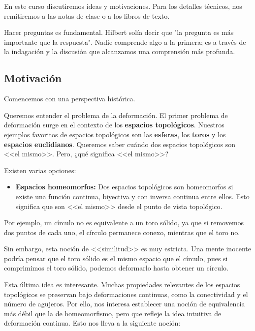 
En este curso discutiremos ideas y motivaciones. Para los detalles técnicos, nos remitiremos a las notas de clase o a los libros de texto.

Hacer preguntas es fundamental. Hilbert solía decir que "la pregunta es más importante que la respuesta". Nadie comprende algo a la primera; es a través de la indagación y la discusión que alcanzamos una comprensión más profunda.

\subsection{Motivación}

Comencemos con una perspectiva histórica.

Queremos entender el problema de la deformación. El primer problema de deformación surge en el contexto de los \textbf{espacios topológicos}. Nuestros ejemplos favoritos de espacios topológicos son las \textbf{esferas}, los \textbf{toros} y los \textbf{espacios euclidianos}. Queremos saber cuándo dos espacios topológicos son <<el mismo>>. Pero, ¿qué significa <<el mismo>>?

Existen varias opciones:

\begin{itemize}
    \item \textbf{Espacios homeomorfos:} Dos espacios topológicos son homeomorfos si existe una función continua, biyectiva y con inversa continua entre ellos. Esto significa que son <<el mismo>> desde el punto de vista topológico.
\end{itemize}

Por ejemplo, un círculo no es equivalente a un toro sólido, ya que si removemos dos puntos de cada uno, el círculo permanece conexo, mientras que el toro no.

Sin embargo, esta noción de <<similitud>> es muy estricta. Una mente inocente podría pensar que el toro sólido es el mismo espacio que el círculo, pues si comprimimos el toro sólido, podemos deformarlo hasta obtener un círculo.

Esta última idea es interesante. Muchas propiedades relevantes de los espacios topológicos se preservan bajo deformaciones continuas, como la conectividad y el número de agujeros. Por ello, nos interesa establecer una noción de equivalencia más débil que la de homeomorfismo, pero que refleje la idea intuitiva de deformación continua. Esto nos lleva a la siguiente noción:

